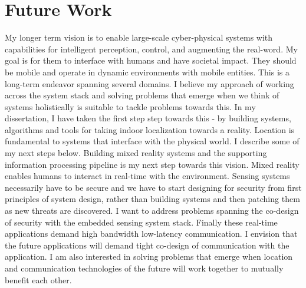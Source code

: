 \documentclass[10pt]{article}
\begin{document}

\section{Future Work}
My longer term vision is to enable large-scale cyber-physical systems with capabilities for intelligent perception, control, and augmenting the real-word. My goal is for them to interface with humans and have societal impact. They should be mobile and operate in dynamic environments with mobile entities. This is a long-term endeavor spanning several domains. I believe my approach of working across the system stack and solving problems that emerge when we think of systems holistically is suitable to tackle problems towards this. In my dissertation, I have taken the first step step towards this - by building systems, algorithms and tools for taking indoor localization towards a reality. Location is fundamental to systems that interface with the physical world.  I describe some of my next steps below. 
Building mixed reality systems and the supporting information processing pipeline is my next step towards this vision. Mixed reality enables humans to interact in real-time with the environment. 
Sensing systems necessarily have to be secure and we have to start designing for security from first principles of system design, rather than building systems and then patching them as new threats are discovered. I want to address problems spanning the co-design of security with the embedded sensing system stack. Finally these real-time applications demand high bandwidth low-latency communication. I envision that the future applications will demand tight co-design of communication with the application. %
I am also interested in solving problems that emerge when location and communication technologies of the future will work together to mutually benefit each other.
\end{document}
